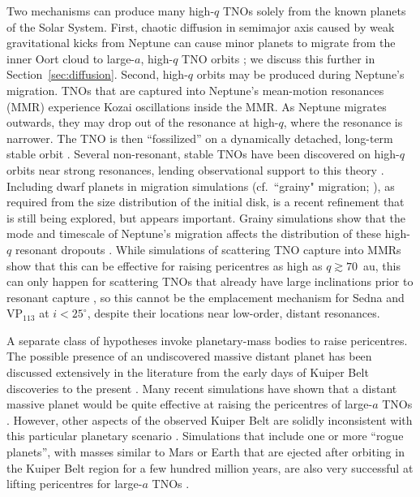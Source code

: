\documentclass[preprint]{aastex62}
\begin{document}
Two mechanisms can produce many high-$q$ TNOs solely from the known planets of the Solar System.
First, chaotic diffusion in semimajor axis caused by weak gravitational kicks from Neptune can cause minor planets to migrate from the inner Oort cloud to large-$a$, high-$q$ TNO orbits \citep{Duncan1987, Kaib:2009, bannister17}; we discuss this further in Section~\ref{sec:diffusion}.
Second, high-$q$ orbits may be produced during Neptune's migration. 
TNOs that are captured into Neptune's mean-motion resonances (MMR) experience Kozai oscillations inside the MMR. 
As Neptune migrates outwards, they may drop out of the resonance at high-$q$, where the resonance is narrower. 
The TNO is then ``fossilized'' on a dynamically detached, long-term stable orbit \citep{gomes03}.
Several non-resonant, stable TNOs have been discovered on high-$q$ orbits near strong resonances, lending observational support to this theory \citep{pike15,lawler18res}.
Including dwarf planets in migration simulations (cf.\ ``grainy" migration; \citealt{nesvorny16}), as required from the size distribution of the initial disk, is a recent refinement that is still being explored, but appears important.
Grainy simulations show that the mode and timescale of Neptune's migration affects the distribution of these high-$q$ resonant dropouts \citep{Nesvornyetal2016,kaib16}.
While simulations of scattering TNO capture into MMRs show that this can be effective for raising pericentres as high as $q\gtrsim70$~au, this can only happen for scattering TNOs that already have large inclinations prior to resonant capture \citep{gallardo12}, so this cannot be the emplacement mechanism for Sedna and VP$_{113}$ at $i<25^{\circ}$, despite their locations near low-order, distant resonances.  

A separate class of hypotheses invoke planetary-mass bodies to raise pericentres.
The possible presence of an undiscovered massive distant planet has been discussed extensively in the literature from the early days of Kuiper Belt discoveries to the present \citep{gladman02,brownetal04,LykawkaMukai2008,soaresgomes13,trujillosheppard14}.
Many recent simulations have shown that a distant massive planet would be quite effective at raising the pericentres of large-$a$ TNOs \citep[][see Figure~\ref{fig:rogue}]{batyginbrown16,shankman17,lawler2017,Lietal2018}.
However, other aspects of the observed Kuiper Belt are solidly inconsistent with this particular planetary scenario \citep{lawler2017,shankman17,shankman17bias,nesvorny17}. 
Simulations that include one or more ``rogue planets'', with masses similar to Mars or Earth that are ejected after orbiting in the Kuiper Belt region for a few hundred million years, are also very successful at lifting pericentres for large-$a$ TNOs \citep{gladmanchan06,silsbee18}.
\end{document}
